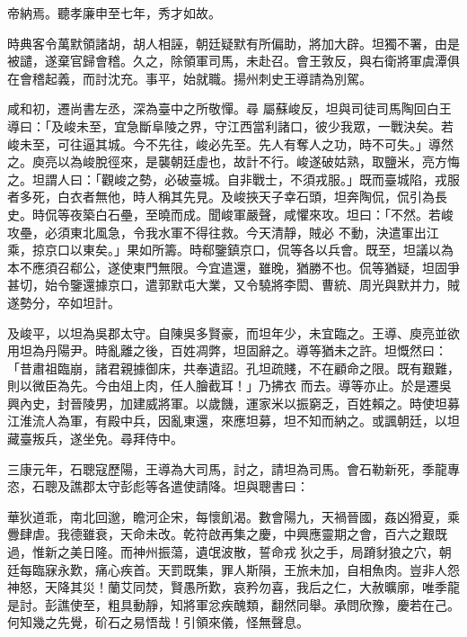 \begin{pinyinscope}
 帝納焉。聽孝廉申至七年，秀才如故。



 時典客令萬默領諸胡，胡人相誣，朝廷疑默有所偏助，將加大辟。坦獨不署，由是被譴，遂棄官歸會稽。久之，除領軍司馬，未赴召。會王敦反，與右衛將軍虞潭俱在會稽起義，而討沈充。事平，始就職。揚州刺史王導請為別駕。



 咸和初，遷尚書左丞，深為臺中之所敬憚。尋
 屬蘇峻反，坦與司徒司馬陶回白王導曰：「及峻未至，宜急斷阜陵之界，守江西當利諸口，彼少我眾，一戰決矣。若峻未至，可往逼其城。今不先往，峻必先至。先人有奪人之功，時不可失。」導然之。庾亮以為峻脫徑來，是襲朝廷虛也，故計不行。峻遂破姑熟，取鹽米，亮方悔之。坦謂人曰：「觀峻之勢，必破臺城。自非戰士，不須戎服。」既而臺城陷，戎服者多死，白衣者無他，時人稱其先見。及峻挾天子幸石頭，坦奔陶侃，侃引為長史。時侃等夜築白石壘，至曉而成。聞峻軍嚴聲，咸懼來攻。坦曰：「不然。若峻攻壘，必須東北風急，令我水軍不得往救。今天清靜，賊必
 不動，決遣軍出江乘，掠京口以東矣。」果如所籌。時郗鑒鎮京口，侃等各以兵會。既至，坦議以為本不應須召郗公，遂使東門無限。今宜遣還，雖晚，猶勝不也。侃等猶疑，坦固爭甚切，始令鑒還據京口，遣郭默屯大業，又令驍將李閎、曹統、周光與默并力，賊遂勢分，卒如坦計。



 及峻平，以坦為吳郡太守。自陳吳多賢豪，而坦年少，未宜臨之。王導、庾亮並欲用坦為丹陽尹。時亂離之後，百姓凋弊，坦固辭之。導等猶未之許。坦慨然曰：「昔肅祖臨崩，諸君親據御床，共奉遺詔。孔坦疏賤，不在顧命之限。既有艱難，則以微臣為先。今由俎上肉，任人膾截耳！」乃拂衣
 而去。導等亦止。於是遷吳興內史，封晉陵男，加建威將軍。以歲饑，運家米以振窮乏，百姓賴之。時使坦募江淮流人為軍，有殿中兵，因亂東還，來應坦募，坦不知而納之。或諷朝廷，以坦藏臺叛兵，遂坐免。尋拜侍中。



 三康元年，石聰寇歷陽，王導為大司馬，討之，請坦為司馬。會石勒新死，季龍專恣，石聰及譙郡太守彭彪等各遣使請降。坦與聰書曰：



 華狄道乖，南北回邈，瞻河企宋，每懷飢渴。數會陽九，天禍晉國，姦凶猾夏，乘釁肆虐。我德雖衰，天命未改。乾符啟再集之慶，中興應靈期之會，百六之艱既過，惟新之美日隆。而神州振蕩，遺氓波散，誓命戎
 狄之手，局蹐豺狼之穴，朝廷每臨寐永歎，痛心疾首。天罰既集，罪人斯隕，王旅未加，自相魚肉。豈非人怨神怒，天降其災！蘭艾同焚，賢愚所歎，哀矜勿喜，我后之仁，大赦曠廓，唯季龍是討。彭譙使至，粗具動靜，知將軍忿疾醜類，翻然同舉。承問欣豫，慶若在己。何知幾之先覺，砎石之易悟哉！引領來儀，怪無聲息。




\end{pinyinscope}
